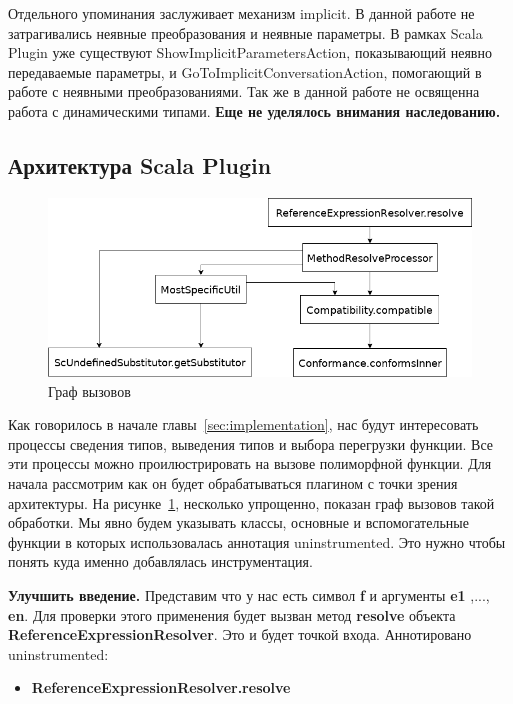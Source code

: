 Отдельного упоминания заслуживает механизм implicit.
В данной работе не затрагивались неявные преобразования и неявные параметры.
В рамках Scala Plugin уже существуют ShowImplicitParametersAction, показывающий
неявно передаваемые параметры, и GoToImplicitConversationAction, помогающий
в работе с неявными преобразованиями.
Так же в данной работе не освященна работа с динамическими типами.
\textbf{Еще не уделялось внимания наследованию.}

\subsection{Архитектура Scala Plugin}
\label{sec:arch}

\begin{figure}[t]
\centering
\includegraphics[width=\textwidth]{img/call-graph}
\caption{Граф вызовов}
\label{fig:callGraph}
\end{figure}

Как говорилось в начале главы~\ref{sec:implementation}, нас будут интересовать
процессы сведения типов, выведения типов и выбора перегрузки функции.
Все эти процессы можно проилюстрировать на вызове полиморфной функции.
Для начала рассмотрим как он будет обрабатываться плагином с
точки зрения архитектуры.
На рисунке~\ref{fig:callGraph}, несколько упрощенно, показан граф вызовов
такой обработки.
Мы явно будем указывать классы, основные и вспомогательные функции в которых
использовалась аннотация uninstrumented.
Это нужно чтобы понять куда именно добавлялась инструментация.

\textbf{Улучшить введение.}
Представим что у нас есть символ \textbf{f} и аргументы
\textbf{e1} ,..., \textbf{en}.
Для проверки этого применения будет вызван метод \textbf{resolve} объекта
\textbf{ReferenceExpressionResolver}.
Это и будет точкой входа.
Аннотировано uninstrumented:
\begin{itemize}
  \item \textbf{ReferenceExpressionResolver.resolve}
\end{itemize}

